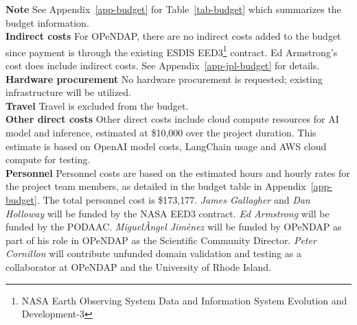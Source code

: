 \documentclass[11pt]{article}
\begin{document}
\noindent 
\textbf{Note} See Appendix~\ref{app-budget} for Table~\ref{tab-budget} which summarizes the budget information.\\
\textbf{Indirect costs} For \ac{OPeNDAP}, there are no indirect costs added to the
budget since payment is through the existing \ac{ESDIS}
EED3\footnote{NASA Earth Observing System Data and Information System Evolution and
Development-3} contract. Ed Armstrong's cost does include indirect
costs. See Appendix~\ref{app-jpl-budget} for details.\\
\textbf{Hardware procurement} No hardware procurement is requested; existing
infrastructure will be utilized.\\
\textbf{Travel} Travel is excluded from the budget.\\
\textbf{Other direct costs} Other direct costs include cloud compute resources
for AI model and inference, estimated at \$10,000 over the project
duration. This estimate is based on OpenAI model costs, LangChain usage and AWS
cloud compute for testing.\\
\textbf{Personnel} Personnel costs are based on the estimated hours and hourly
rates for the project team members, as detailed in the budget table in Appendix~\ref{app-budget}. The
total personnel cost is \$173,177. {\em James Gallagher} and {\em Dan Holloway}
will be funded by the NASA EED3 contract. {\em Ed
Armstrong} will be funded by the \ac{PODAAC}.
{\em Miguel\`{A}ngel Jim\`{e}nez} will be funded by \ac{OPeNDAP} as part
of his role in \ac{OPeNDAP} as the Scientific Community Director. {\em Peter
Cornillon} will contribute unfunded domain validation and testing as a
collaborator at \ac{OPeNDAP} and the University of Rhode Island. 

\pagebreak

\appendix
\end{document}
